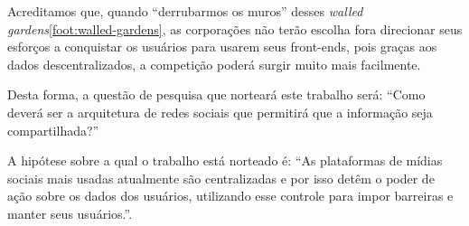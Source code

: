 Acreditamos que, quando ``derrubarmos os muros'' desses \textit{walled gardens}\ref{foot:walled-gardens}, as corporações não terão escolha fora direcionar seus esforços a conquistar os usuários para usarem seus front-ends, pois graças aos dados descentralizados, a competição poderá surgir muito mais facilmente.


Desta forma, a questão de pesquisa que norteará este trabalho será: ``Como deverá ser a arquitetura de redes sociais que permitirá que a informação seja compartilhada?''

A hipótese sobre a qual o trabalho está norteado é: ``As plataformas de mídias sociais mais usadas atualmente são centralizadas e por isso detêm o poder de ação sobre os dados dos usuários, utilizando esse controle para impor barreiras e manter seus usuários.''.




